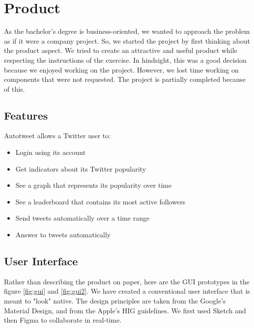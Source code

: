 \documentclass{report}
\begin{document}
\chapter{Product}

As the bachelor's degree is business-oriented, we wanted to approach the problem as if it were a company project. So, we started the project by first thinking about the product aspect. We tried to create an attractive and useful product while respecting the instructions of the exercise. In hindsight, this was a good decision because we enjoyed working on the project. However, we lost time working on components that were not requested. The project is partially completed because of this.

\section{Features}
Autotweet allows a Twitter user to:
\begin{itemize}
\item Login using its account
\item Get indicators about its Twitter popularity
\item See a graph that represents its popularity over time
\item See a leaderboard that contains its most active followers
\item Send tweets automatically over a time range
\item Answer to tweets automatically

\end{itemize}

\section{User Interface}
Rather than describing the product on paper, here are the GUI prototypes in the figure \ref{fig:gui} and \ref{fig:gui2}. We have created a conventional user interface that is meant to "look" native. The design principles are taken from the Google's Material Design, and from the Apple's HIG guidelines. We first used Sketch and then Figma to collaborate in real-time.
\end{document}
